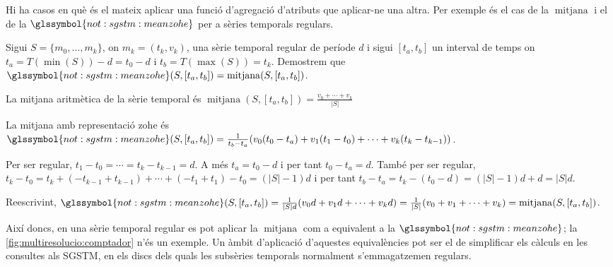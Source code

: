 \begin{example}

  Hi ha casos en què és el mateix aplicar una funció d'agregació
  d'atributs que aplicar-ne una altra. Per exemple és el cas de la
  $\operatorname{mitjana}$ i el de la
  $\glssymbol{not:sgstm:meanzohe}$ per a sèries temporals regulars. 

  Sigui $S=\{m_0,\dotsc,m_k\}$, on $m_k=(t_k,v_k)$, una sèrie temporal
  regular de període $d$ i sigui $[t_a,t_b]$ un interval de temps on
  $t_a=T(\min(S))-d=t_0-d$ i $t_b=T(\max(S))=t_k$.  Demostrem que
  $\glssymbol{not:sgstm:meanzohe}(S,[t_a,t_b]) =
  \operatorname{mitjana}(S,[t_a,t_b])$.

  La mitjana aritmètica de la sèrie temporal és
  $\operatorname{mitjana}(S,[t_a,t_b])=\frac{v_0+\dotsb+v_k}{|S|}$
  
  La mitjana amb representació \gls{zohe} és
  $\glssymbol{not:sgstm:meanzohe}(S,[t_a,t_b])= \frac{1}{t_b-t_a} (
  v_0(t_0-t_a)+v_1(t_1-t_0)+\dotsb+ v_k(t_k-t_{k-1}) )$.

  Per ser regular, $t_1-t_0 = \dotsb = t_k-t_{k-1} = d$. A més
  $t_a=t_0-d$ i per tant $t_0-t_a = d$. També per ser regular,
  $t_k-t_0= t_k +(- t_{k-1} + t_{k-1}) + \dotsb + (- t_1 + t_1) - t_0
  = (|S|-1)d$ i per tant $t_b-t_a=t_k - (t_0 - d) = (|S|-1)d +d = |S|d$.

  Reescrivint, $\glssymbol{not:sgstm:meanzohe}(S,[t_a,t_b])=
  \frac{1}{|S|d} ( v_0d+v_1d+\dotsb+ v_kd ) = \frac{1}{|S|} (
  v_0+v_1+\dotsb+ v_k ) = \operatorname{mitjana}(S,[t_a,t_b])$.



  Així doncs, en una sèrie temporal regular es pot aplicar la
  $\operatorname{mitjana}$ com a equivalent a la
  $\glssymbol{not:sgstm:meanzohe}$; la
  \autoref{fig:multiresolucio:comptador} n'és un exemple. Un àmbit
  d'aplicació d'aquestes equivalències pot ser el de simplificar els
  càlculs en les consultes als \gls{SGSTM}, en els discs dels quals
  les subsèries temporals normalment s'emmagatzemen regulars.
  
\end{example}













 











